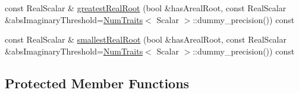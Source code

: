 \begin{DoxyCompactItemize}
const Real\+Scalar \& \hyperlink{class_eigen_1_1_polynomial_solver_base_a5094b7ccc49918b7c7ae9e2a8c49d4bd}{greatest\+Real\+Root} (bool \&has\+Areal\+Root, const Real\+Scalar \&abs\+Imaginary\+Threshold=\hyperlink{group___core___module_struct_eigen_1_1_num_traits}{Num\+Traits}$<$ Scalar $>$\+::dummy\+\_\+precision()) const
\item 
const Real\+Scalar \& \hyperlink{class_eigen_1_1_polynomial_solver_base_a24b054cdf82a8e9409bea47c3c05c756}{smallest\+Real\+Root} (bool \&has\+Areal\+Root, const Real\+Scalar \&abs\+Imaginary\+Threshold=\hyperlink{group___core___module_struct_eigen_1_1_num_traits}{Num\+Traits}$<$ Scalar $>$\+::dummy\+\_\+precision()) const
\end{DoxyCompactItemize}
\subsection*{Protected Member Functions}
